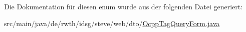 Die Dokumentation für diesen enum wurde aus der folgenden Datei generiert\+:\begin{DoxyCompactItemize}
\item 
src/main/java/de/rwth/idsg/steve/web/dto/\hyperlink{_ocpp_tag_query_form_8java}{Ocpp\+Tag\+Query\+Form.\+java}\end{DoxyCompactItemize}
